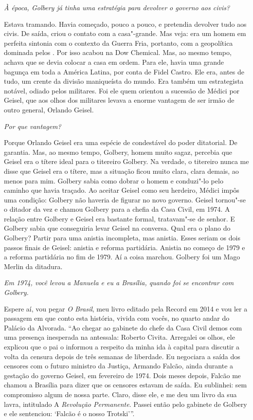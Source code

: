 \itshape
 À época, Golbery já tinha uma estratégia para devolver
o governo aos civis?

\normalfont
Estava tramando. Havia começado, pouco a pouco, e
pretendia devolver tudo aos civis. De saída, criou o contato com a
casa"-grande. Mas veja: era um homem em perfeita sintonia com o contexto
da Guerra Fria, portanto, com a geopolítica dominada pelos . Por isso
acabou na Dow Chemical. Mas, ao mesmo tempo, achava que se devia colocar
a casa em ordem. Para ele, havia uma grande bagunça em toda a América
Latina, por conta de Fidel Castro. Ele era, antes de tudo, um crente da
divisão maniqueísta do mundo. Era também um estrategista notável, odiado
pelos militares. Foi ele quem orientou a sucessão de Médici por Geisel,
que aos olhos dos militares levava a enorme vantagem de ser irmão de
outro general, Orlando Geisel.

\itshape
 Por que vantagem?

\normalfont
Porque Orlando Geisel era uma espécie de condestável do
poder ditatorial. De garantia. Mas, ao mesmo tempo, Golbery, homem muito
sagaz, percebia que Geisel era o títere ideal para o titereiro Golbery.
Na verdade, o titereiro nunca me disse que Geisel era o títere, mas a
situação ficou muito clara, clara demais, ao menos para mim. Golbery
sabia como dobrar o homem e conduzi"-lo pelo caminho que havia traçado.
Ao aceitar Geisel como seu herdeiro, Médici impôs uma condição: Golbery
não haveria de figurar no novo governo. Geisel tornou"-se o ditador da
vez e chamou Golbery para a chefia da Casa Civil, em 1974. A relação
entre Golbery e Geisel era bastante formal, tratavam"-se de senhor. E
Golbery sabia que conseguiria levar Geisel na conversa. Qual era o plano
do Golbery? Partir para uma anistia incompleta, mas anistia. Esses
seriam os dois passos finais de Geisel: anistia e reforma partidária.
Anistia no começo de 1979 e a reforma partidária no fim de 1979. Aí a
coisa marchou. Golbery foi um Mago Merlin da ditadura.

\itshape
 Em 1974, você levou a Manuela e eu a Brasília, quando
foi se encontrar com Golbery.

\normalfont
Espere aí, vou pegar \emph{O Brasil}, meu livro editado
pela Record em 2014 e vou ler a passagem em que conto esta história,
vivida com vocês, no quarto andar do Palácio da Alvorada. ``Ao chegar ao
gabinete do chefe da Casa Civil demos com uma presença inesperada na
antessala: Roberto Civita. Arregalei os olhos, ele explicou que o pai o
informou a respeito da minha ida à capital para discutir a volta da
censura depois de três semanas de liberdade. Eu negociara a saída dos
censores com o futuro ministro da Justiça, Armando Falcão, ainda durante
a gestação do governo Geisel, em fevereiro de 1974. Dois meses depois,
Falcão me chamou a Brasília para dizer que os censores estavam de saída.
Eu sublinhei: sem compromisso algum de nossa parte. Claro, disse ele, e
me deu um livro da sua lavra, intitulado A \emph{Revolução Permanente}.
Passei então pelo gabinete de Golbery e ele sentenciou: `Falcão é o
nosso Trotski'''.

